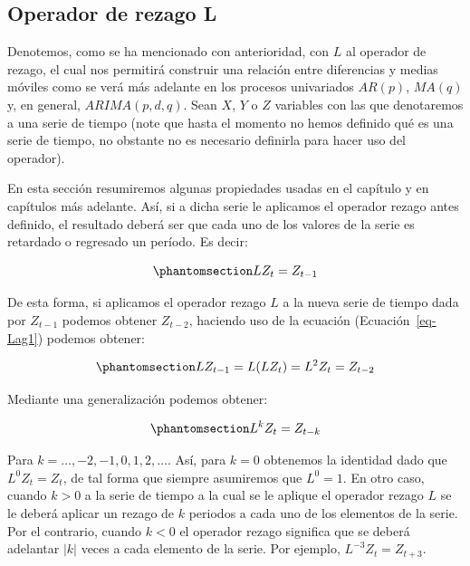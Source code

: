 \documentclass[
  a4paper,
]{article}
\begin{document}
\subsection{Operador de rezago L}\label{operador-de-rezago-l}

Denotemos, como se ha mencionado con anterioridad, con \(L\) al operador
de rezago, el cual nos permitirá construir una relación entre
diferencias y medias móviles como se verá más adelante en los procesos
univariados \(AR(p)\), \(MA(q)\) y, en general, \(ARIMA(p, d, q)\). Sean
\(X\), \(Y\) o \(Z\) variables con las que denotaremos a una serie de
tiempo (note que hasta el momento no hemos definido qué es una serie de
tiempo, no obstante no es necesario definirla para hacer uso del
operador).

En esta sección resumiremos algunas propiedades usadas en el capítulo y
en capítulos más adelante. Así, si a dicha serie le aplicamos el
operador rezago antes definido, el resultado deberá ser que cada uno de
los valores de la serie es retardado o regresado un período. Es decir:

\begin{equation}\phantomsection\label{eq-Lag1}{
    L Z_t = Z_{t-1}
}\end{equation}

De esta forma, si aplicamos el operador rezago \(L\) a la nueva serie de
tiempo dada por \(Z_{t-1}\) podemos obtener \(Z_{t-2}\), haciendo uso de
la ecuación (Ecuación~\ref{eq-Lag1}) podemos obtener:

\begin{equation}\phantomsection\label{eq-Lag2}{
    L Z_{t-1} = L(L Z_t) = L^2 Z_t = Z_{t-2}
}\end{equation}

Mediante una generalización podemos obtener:

\begin{equation}\phantomsection\label{eq-Lag3}{
    L^k Z_t = Z_{t-k}
}\end{equation}

Para \(k = \ldots, -2, -1, 0, 1, 2, \ldots\). Así, para \(k = 0\)
obtenemos la identidad dado que \(L^0 Z_t = Z_t\), de tal forma que
siempre asumiremos que \(L^0 = 1\). En otro caso, cuando \(k > 0\) a la
serie de tiempo a la cual se le aplique el operador rezago \(L\) se le
deberá aplicar un rezago de \(k\) periodos a cada uno de los elementos
de la serie. Por el contrario, cuando \(k < 0\) el operador rezago
significa que se deberá adelantar \(|k|\) veces a cada elemento de la
serie. Por ejemplo, \(L^{-3} Z_t = Z_{t+3}\).
\end{document}
